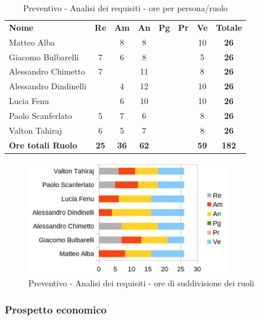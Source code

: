 		\begin{table} [h!]
			\begin{center}
				\begin{tabular} { m{3.5cm} c c c c c c c }
					\rowcolor{lightgray}
					\textbf{Nome} & \textbf{Re} & \textbf{Am} & \textbf{An} & \textbf{Pg} & \textbf{Pr} & \textbf{Ve} & \textbf{Totale} \\
					Matteo Alba & & 8 & 8 & & & 10 & \textbf{26} \\
					Giacomo Bulbarelli & 7 & 6 & 8 & & & 5 & \textbf{26} \\
					Alessandro Chimetto & 7 & & 11 & & & 8 & \textbf{26} \\
					Alessandro Dindinelli & & 4 & 12 & & & 10 & \textbf{26} \\
					Lucia Fenu & & 6 & 10 & & & 10 & \textbf{26} \\
					Paolo Scanferlato & 5 & 7 & 6 & & & 8 & \textbf{26} \\
					Valton Tahiraj & 6 & 5 & 7 & & & 8 & \textbf{26} \\
					\textbf{Ore totali Ruolo} & \textbf{25} & \textbf{36} & \textbf{62} & \textbf{} & \textbf{}& \textbf{59} & \textbf{182}
				\end{tabular}
				\caption{Preventivo - Analisi dei requisiti - ore per persona/ruolo}
			\end{center}
		\end{table}

		\begin{figure} [h!]
			\centering
			\includegraphics[width=0.8\textwidth]{res/img/grafici/analisi_dei_requisiti_ore_ruolo.jpg}
			\caption{Preventivo - Analisi dei requisiti - ore di suddivisione dei ruoli} 
		\end{figure}

	\newpage

	\subsubsection{Prospetto economico}

